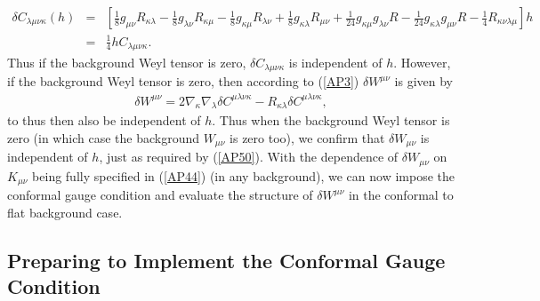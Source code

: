 \documentclass[aps]{revtex4}
\begin{document}
%
%
\begin{eqnarray}
\delta C_{\lambda\mu\nu\kappa}(h)&=&\left[\tfrac{1}{8} g_{\mu \nu}  R_{\kappa \lambda} -  \tfrac{1}{8} g_{\lambda \nu} R_{\kappa \mu} -  \tfrac{1}{8} g_{\kappa \mu}  R_{\lambda \nu} +\tfrac{1}{8} g_{\kappa \lambda}  R_{\mu \nu} + \tfrac{1}{24} g_{\kappa \mu} g_{\lambda \nu}  R -  \tfrac{1}{24} g_{\kappa \lambda} g_{\mu \nu}  R -  \tfrac{1}{4}  R_{\kappa \nu \lambda \mu}\right]h
\nonumber\\
&=&\frac{1}{4}hC_{\lambda\mu\nu\kappa}.
\label{AP52}
\end{eqnarray}
%
Thus if the background Weyl tensor is zero, $\delta C_{\lambda\mu\nu\kappa}$ is independent of $h$. However, if the background Weyl tensor is zero, then according to (\ref{AP3}) $\delta W^{\mu\nu}$ is given by 
%
\begin{eqnarray}
\delta W^{\mu\nu}=2\nabla_{\kappa}\nabla_{\lambda}\delta C^{\mu\lambda\nu\kappa}-
R_{\kappa\lambda}\delta C^{\mu\lambda\nu\kappa},
\label{AP53}
\end{eqnarray}
%
to thus then also be independent of $h$. Thus when the background Weyl tensor is zero  (in which case the background $W_{\mu\nu}$ is zero too), we confirm that $\delta W_{\mu\nu}$ is  independent of $h$, just as required by (\ref{AP50}). With the dependence of $\delta W_{\mu\nu}$ on $K_{\mu\nu}$ being fully specified in (\ref{AP44}) (in any background), we can now impose the conformal gauge condition and evaluate the structure of $\delta W^{\mu\nu}$ in the conformal to flat background case.

\subsection{Preparing to Implement the Conformal Gauge Condition}
\end{document}
